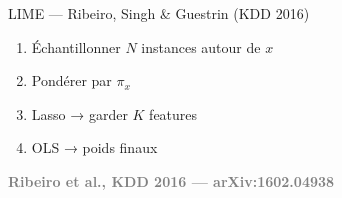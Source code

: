 \documentclass[10pt]{beamer}
\newcommand{\source}[1]{\vspace{6pt}\hfill{\textcolor{gray}{\textbf{\tiny #1}}}}
\begin{document}
\begin{frame}{LIME --- Ribeiro, Singh \& Guestrin (KDD 2016)}
\begin{minipage}{0.48\textwidth}
		\begin{tcolorbox}[
			colback=red!3,
			colframe=red!60!black,
			arc=2mm,
			boxrule=0.5pt,
			fonttitle=\bfseries,
			title={Algorithme (K-Lasso)}
			]
			\begin{enumerate}
				\item Échantillonner $N$ instances autour de $x$
				\item Pondérer par $\pi_x$
				\item Lasso → garder $K$ features
				\item OLS → poids finaux
			\end{enumerate}
		\end{tcolorbox}
	\end{minipage}
	
	\vspace{8pt}
	\source{Ribeiro et al., KDD 2016 --- arXiv:1602.04938}
\end{frame}
\end{document}
